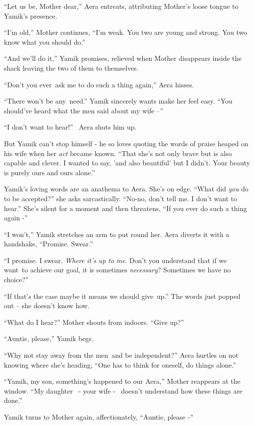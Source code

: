 \documentclass[twoside,11pt]{book}
\begin{document}
``Let us be, Mother dear,'' Aera entreats, attributing Mother's loose tongue to Yamik's
presence.

``I'm old,'' Mother continues, ``I'm weak. You two are young and strong. You two
know what you should do.''

``And we'll do it,'' Yamik promises, relieved when Mother disappears inside the shack leaving
the two of them to themselves.

``Don't you ever~ask me to do such a thing again,'' Aera hisses.

``There won't be any~need.'' Yamik sincerely wants make her feel easy. ``You
should've heard what the men said about my wife --''

``I don't want to hear!'' \ Aera shuts him up.

But Yamik can't stop himself - he so loves quoting the words of praise heaped on his wife when her \textit{act} became
known. ``That she's not only brave but is also capable and clever. I wanted to say, 'and also beautiful'
but I didn't. Your beauty is purely ours and ours alone.'' ~

Yamik's loving words are an anathema to Aera. She's on edge. ``What did \textit{you} do to be
accepted?'' she asks sarcastically. ``No-no, don't tell me. I don't want to
hear.'' She's silent for a moment and then threatens, ``If you ever do such a thing again
-''

``I won't,'' Yamik stretches an arm to put round her. Aera diverts it with a handshake,
``Promise. Swear.''

``I promise. I swear. \textit{Where it's up to me}. Don't you understand that if we want~to achieve our
goal, it is sometimes \textit{necessary}? Sometimes we have no choice?''

``If that's the case maybe it means we should give~up.'' The words just popped out -- she
doesn't know how.

{}``What do I hear?'' Mother shouts from indoors. ``Give up?''

{}``Auntie, please,'' Yamik begs.

{}``Why not stay away from the men~and be independent?'' Aera hurtles on not knowing where she's heading,
``One has to think for oneself, do things alone.''

``Yamik, my son, something's happened to our Aera,'' Mother reappears at the window.
``My daughter \ {}- your wife - \ doesn't understand how these things are done.''

Yamik turns to Mother again, affectionately, ``Auntie, please -''
\end{document}
